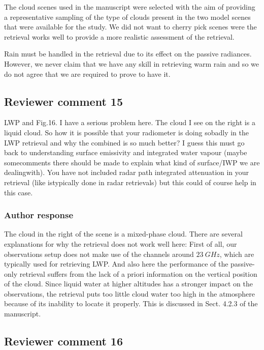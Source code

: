 \documentclass[11pt]{scrartcl}
\begin{document}
The cloud scenes used in the manuscript were selected with the aim of providing
a representative sampling of the type of clouds present in the two model scenes that
were available for the study. We did not want to cherry pick scenes were the
retrieval works well to provide a more realistic assessment of  the retrieval.

Rain must be handled in the retrieval due to its effect on the passive
radiances. However, we never claim that we have any skill in retrieving warm
rain and so we do not agree that we are required to prove to have it.

\subsection*{Reviewer comment 15}

 LWP and Fig.16. I have a serious problem here. The cloud I see on the right is a
 liquid cloud. So how it is possible that your radiometer is doing sobadly in
 the LWP retrieval and why the combined is so much better? I guess this must go
 back to understanding surface emissivity and integrated water vapour (maybe
 somecomments there should be made to explain what kind of surface/IWP we are
 dealingwith). You have not included radar path integrated attenuation in your
 retrieval (like istypically done in radar retrievals) but this could of course
 help in this case.

\subsubsection*{Author response}

The cloud in the right of the scene is a mixed-phase cloud. There are several
explanations for why the retrieval does not work well here: First of all, our
observations setup does not make use of the channels around $23\ \unit{GHz}$,
which are typically used for retrieving LWP. And also here the performance of
the passive-only retrieval suffers from the lack of a priori information on the
vertical position of the cloud. Since liquid water at higher altitudes has a
stronger impact on the observations, the retrieval puts too little cloud water
too high in the atmosphere because of its inability to locate it properly. This
is discussed in Sect. 4.2.3 of the manuscript.

\subsection*{Reviewer comment 16}
\end{document}
